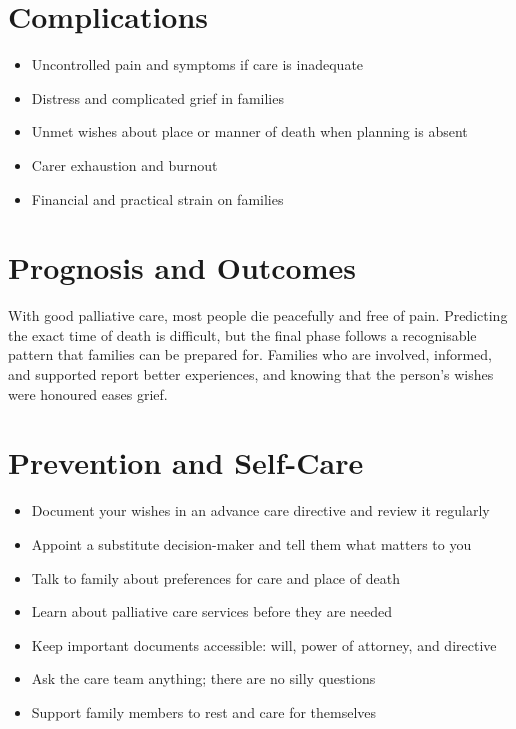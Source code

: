 \section*{Complications}
\begin{itemize}
    \item Uncontrolled pain and symptoms if care is inadequate
    \item Distress and complicated grief in families
    \item Unmet wishes about place or manner of death when planning is absent
    \item Carer exhaustion and burnout
    \item Financial and practical strain on families
\end{itemize}

\section*{Prognosis and Outcomes}
With good palliative care, most people die peacefully and free of pain. Predicting the exact time of death is difficult, but the final phase follows a recognisable pattern that families can be prepared for. Families who are involved, informed, and supported report better experiences, and knowing that the person's wishes were honoured eases grief.

\section*{Prevention and Self-Care}
\begin{itemize}
    \item Document your wishes in an advance care directive and review it regularly
    \item Appoint a substitute decision-maker and tell them what matters to you
    \item Talk to family about preferences for care and place of death
    \item Learn about palliative care services before they are needed
    \item Keep important documents accessible: will, power of attorney, and directive
    \item Ask the care team anything; there are no silly questions
    \item Support family members to rest and care for themselves
\end{itemize}

